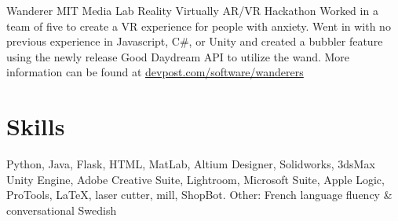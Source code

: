 \documentclass[11.5pt]{moderncv}
\begin{document}
{Wanderer}
{MIT Media Lab Reality Virtually AR/VR Hackathon}
{}
{}
{Worked in a team of five to create a VR experience for people with anxiety. Went in with no previous experience in Javascript, C\#, or Unity and created a bubbler feature using the newly release Good Daydream API to utilize the wand. More information can be found at \href{https://devpost.com/software/wanderers}{devpost.com/software/wanderers}}

\section{Skills}

\cvline{}
{
Python,
Java,
Flask,
HTML,
MatLab,
Altium Designer,
Solidworks,
3dsMax
Unity Engine,
Adobe Creative Suite,
Lightroom,
Microsoft Suite,
Apple Logic,
ProTools,
\LaTeX{},
laser cutter,
mill,
ShopBot.
}
\cvline{}
{Other: French language fluency \& conversational Swedish}
\end{document}
